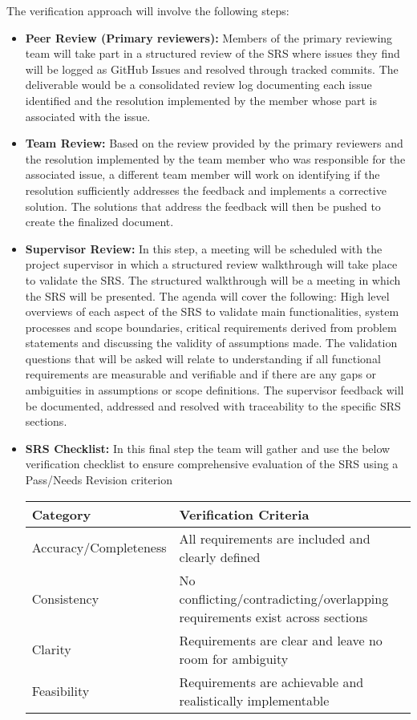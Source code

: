 \documentclass[12pt, titlepage]{article}
\begin{document}
The verification approach will involve the following steps:
\begin{itemize}
    \item \textbf{Peer Review (Primary reviewers):} Members of the primary reviewing team will take part in a structured review of the SRS where issues they find will be logged as GitHub Issues and resolved through tracked commits. The deliverable would be a consolidated review log documenting each issue identified and the resolution implemented by the member whose part is associated with the issue.
    \item \textbf{Team Review:} Based on the review provided by the primary reviewers and the resolution implemented by the team member who was responsible for the associated issue, a different team member will work on identifying if the resolution sufficiently addresses the feedback and implements a corrective solution. The solutions that address the feedback will then be pushed to create the finalized document.
    \item \textbf{Supervisor Review:} In this step, a meeting will be scheduled with the project supervisor in which a structured review walkthrough will take place to validate the SRS. The structured walkthrough will be a meeting in which the SRS will be presented. The agenda will cover the following: High level overviews of each aspect of the SRS to validate main functionalities, system processes and scope boundaries, critical requirements derived from problem statements and discussing the validity of assumptions made. The validation questions that will be asked will relate to understanding if all functional requirements are measurable and verifiable and if there are any gaps or ambiguities in assumptions or scope definitions. The supervisor feedback will be documented, addressed and resolved with traceability to the specific SRS sections.
    \item \textbf{SRS Checklist:} In this final step the team will gather and use the below verification checklist to ensure comprehensive evaluation of the SRS using a Pass/Needs Revision criterion
    \begin{center}
    \begin{tabular}{|p{4cm}|p{9cm}|}
        \hline
        \textbf{Category} & \textbf{Verification Criteria} \\ \hline
        Accuracy/Completeness & All requirements are included and clearly defined \\ \hline
        Consistency & No conflicting/contradicting/overlapping requirements exist across sections \\ \hline
        Clarity & Requirements are clear and leave no room for ambiguity \\ \hline
        Feasibility & Requirements are achievable and realistically implementable \\ \hline
    \end{tabular}
    \end{center}
\end{itemize}
\end{document}

